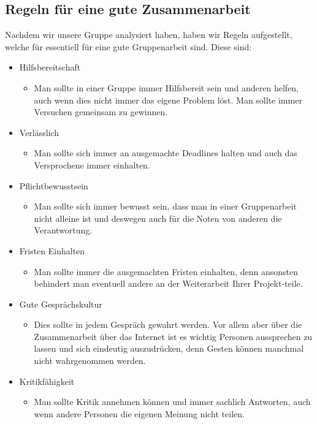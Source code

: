 \documentclass[12pt]{article}
\begin{document}
\subsection{Regeln für eine gute Zusammenarbeit}
Nachdem wir unsere Gruppe analysiert haben, haben wir Regeln aufgestellt, welche für essentiell für eine gute Gruppenarbeit sind. Diese sind:
\begin{itemize}
 \item Hilfsbereitschaft
 \begin{itemize}
  \item [] Man sollte in einer Gruppe immer Hilfsbereit sein und anderen helfen, auch wenn dies nicht immer das eigene Problem löst. Man sollte immer Versuchen gemeinsam zu gewinnen.
 \end{itemize}
 \item Verlässlich
 \begin{itemize}
  \item [] Man sollte sich immer an ausgemachte Deadlines halten und auch das Versprochene immer einhalten.
 \end{itemize}
 \item Pflichtbewusstsein
 \begin{itemize}
  \item [] Man sollte sich immer bewusst sein, dass man in einer Gruppenarbeit nicht alleine ist und deswegen auch für die Noten von anderen die Verantwortung.
 \end{itemize}
 \item Fristen Einhalten
 \begin{itemize}
  \item [] Man sollte immer die ausgemachten Fristen einhalten, denn ansonsten behindert man eventuell andere an der Weiterarbeit Ihrer Projekt-teile.
 \end{itemize}
 \item Gute Gesprächskultur
 \begin{itemize}
  \item [] Dies sollte in jedem Gespräch gewahrt werden. Vor allem aber über die Zusammenarbeit über das Internet ist es wichtig Personen aussprechen zu lassen und sich eindeutig auszudrücken, denn Gesten können manchmal nicht wahrgenommen werden.
 \end{itemize}
 \item Kritikfähigkeit
 \begin{itemize}
  \item [] Man sollte Kritik annehmen können und immer sachlich Antworten, auch wenn andere Personen die eigenen Meinung nicht teilen.

\end{itemize}
\end{itemize}
\end{document}
